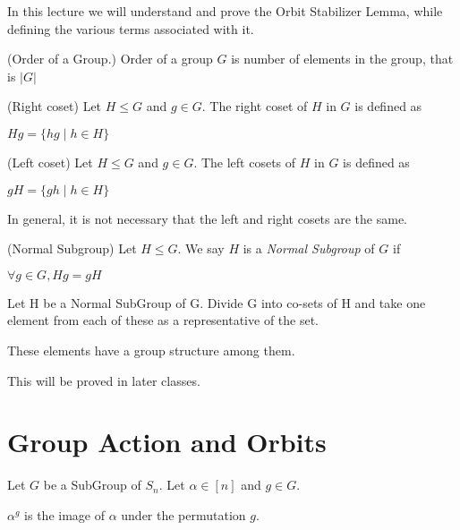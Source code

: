 

In this lecture we will understand and prove the Orbit Stabilizer Lemma, while defining the various terms associated with it.


\begin{definition}(Order of a Group.) Order of a group $G$ is number of elements in the group, that is $|G|$ \end{definition}

\begin{definition}(Right coset) Let $H \le G$ and $g \in G$. The right coset of $H$ in $G$ is defined as 
\begin{center}
$Hg = \{hg \mid h \in H\}$
\end{center}
 \end{definition}

\begin{definition}(Left coset) Let $H \le G$ and $g \in G$. The left cosets of $H$ in $G$ is defined as 
\begin{center}
$gH = \{gh \mid h \in H\}$
\end{center}
\end{definition}

\begin{note}
In general, it is not necessary that the left and right cosets are the same.
\end{note}

\begin{definition}(Normal Subgroup)
Let $H \le G$. We say $H$ is a {\em Normal Subgroup} of $G$ if
\begin{center}
$\forall g \in G, Hg= gH$
\end{center}
\end{definition}

Let H be a Normal SubGroup of G. Divide G into co-sets of H and take one element from each of these as a representative of the set.
\begin{claim} These elements have a group structure among them. \end{claim}
This will be proved in later classes.

\section{Group Action and Orbits}
Let $G$ be a SubGroup of $S_n$. Let $\alpha \in [n]$ and $g \in G$.

\begin{notation} $\alpha^g$ is the image of $\alpha$ under the permutation $g$. 
\end{notation}


